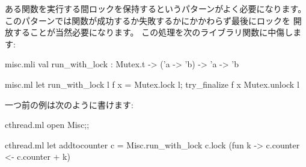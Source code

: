 ある関数を実行する間ロックを保持するというパターンがよく必要になります。
このパターンでは関数が成功するか失敗するかにかかわらず最後にロックを
開放することが当然必要になります。
この処理を次のライブラリ関数に中傷します:
\begin{codefile}{misc.mli}
val run_with_lock : Mutex.t -> ('a -> 'b) -> 'a -> 'b
\end{codefile}
\begin{listingcodefile}{misc.ml}
let run_with_lock l f x =
  Mutex.lock l; try_finalize f x Mutex.unlock l
\end{listingcodefile}
一つ前の例は次のように書けます:
\begin{codefile}{cthread.ml}
open Misc;;
\end{codefile}
\begin{listingcodefile}{cthread.ml}
let addtocounter c =
  Misc.run_with_lock c.lock (fun k -> c.counter <- c.counter + k)
\end{listingcodefile}

